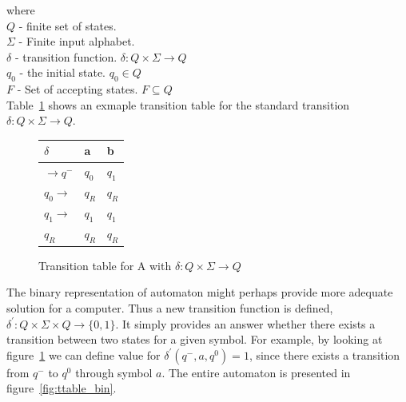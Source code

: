 \documentclass{mini}
\begin{document}
where \\
$Q$ - finite set of states. \\
$\Sigma$ - Finite input alphabet. \\
$\delta$ - transition function. $\delta: Q \times \Sigma \rightarrow Q$ \\
$q_0$ - the initial state. $q_0 \in Q$ \\
$F$ - Set of accepting states. $F \subseteq Q$ \\

Table~\ref{fig:ttable_std} shows an exmaple transition table for the standard transition $\delta: Q \times \Sigma \rightarrow Q$.

%
%
\begin{figure}[H]
    \CenterFloatBoxes
    \begin{floatrow}
        
        \ttabbox
        {
            \centering
            \setlength{\tabcolsep}{15pt}
            \renewcommand{\arraystretch}{1.5}
            \begin{tabular}{|P{1.0cm} || P{0.6cm} | P{0.6cm} |}
                \hline
                $\delta$ & a & b \\
                \hline
                \hline
                $\rightarrow q^-$ 		& $q_0$ & $q_1$ \\
                \hline
                $q_0 \rightarrow$ 		& $q_R$ & $q_R$ \\
                \hline
                $q_1 \rightarrow$ 		& $q_1$ & $q_1$ \\
                \hline
                $q_R$  					& $q_R$ & $q_R$ \\
                \hline
            \end{tabular}
        }
        {\caption{Transition table for A with $\delta: Q \times \Sigma \rightarrow Q$}\label{fig:ttable_std}}
        
        
    \end{floatrow}
\end{figure}


The binary representation of automaton might perhaps provide more adequate solution for a computer. Thus a new transition function is defined, $\delta^{'}: Q \times \Sigma \times Q \rightarrow \{0,1\}$. It simply provides an answer whether there exists a transition between two states for a given symbol. For example, by looking at figure~\ref{fig:ttable_std} we can define value for $\delta^{'}(q^-,a,q^0) = 1$, since there exists a transition from $q^-$ to $q^0$ through symbol $a$. The entire automaton is presented in figure~\ref{fig:ttable_bin}.
\end{document}
